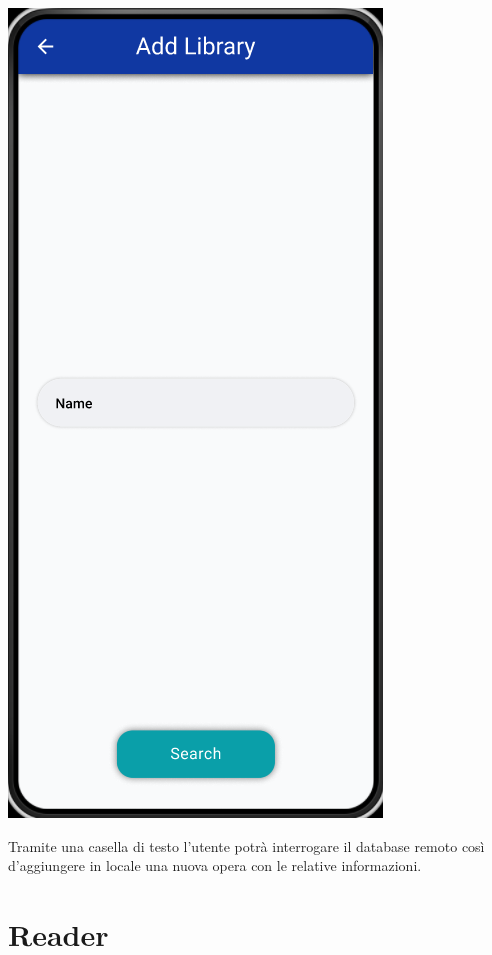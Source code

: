 \documentclass{report}
\begin{document}
\begin{center}
  \includegraphics[scale=0.4]{add_library.png}
\end{center}

Tramite una casella di testo l'utente potrà interrogare il database remoto così d'aggiungere in locale una nuova opera con le relative informazioni.

\section{Reader}\label{sec:reader}
\end{document}
